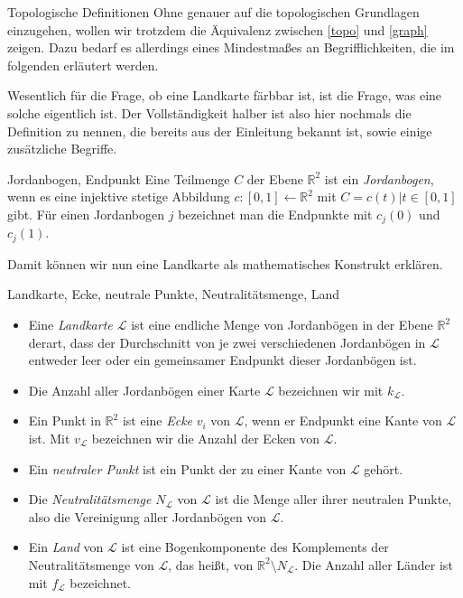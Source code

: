 \begin{section}{Topologische Definitionen}
 Ohne genauer auf die topologischen Grundlagen einzugehen, wollen wir trotzdem die Äquivalenz zwischen \ref{topo} und \ref{graph} zeigen. Dazu bedarf es allerdings eines Mindestmaßes an Begrifflichkeiten, die im folgenden erläutert werden.
 
 Wesentlich für die Frage, ob eine Landkarte färbbar ist, ist die Frage, was eine solche eigentlich ist. Der Vollständigkeit halber ist also hier nochmals die Definition zu nennen, die bereits aus der Einleitung bekannt ist, sowie einige zusätzliche Begriffe.
 
 \begin{definition}{Jordanbogen, Endpunkt}
  Eine Teilmenge $C$ der Ebene $\mathbb{R}^2$ ist ein \textit{Jordanbogen}, wenn es eine injektive stetige Abbildung $c:[0,1] \leftarrow \mathbb{R}^2$ mit $C = {c(t)|t\in [0,1]}$ gibt. Für einen Jordanbogen $j$ bezeichnet man die Endpunkte mit $c_j(0)$ und $c_j(1)$.
 \end{definition}
 
 Damit können wir nun eine Landkarte als mathematisches Konstrukt erklären.
 
 \begin{definition}{Landkarte, Ecke, neutrale Punkte, Neutralitätsmenge, Land}
  \-\ 
  \begin{itemize}
    \item Eine \textit{Landkarte $\mathcal{L}$} ist eine endliche Menge von Jordanbögen in der Ebene $\mathbb{R}^2$ derart, dass der Durchschnitt von je zwei verschiedenen Jordanbögen in $\mathcal{L}$ entweder leer oder ein gemeinsamer Endpunkt dieser Jordanbögen ist.
    \item Die Anzahl aller Jordanbögen einer Karte $\mathcal{L}$ bezeichnen wir mit $k_\mathcal{L}$.
    \item Ein Punkt in $\mathbb{R}^2$ ist eine \textit{Ecke} $v_i$ von $\mathcal{L}$, wenn er Endpunkt eine Kante von $\mathcal{L}$ ist. Mit $v_\mathcal{L}$ bezeichnen wir die Anzahl der Ecken von $\mathcal{L}$.
    \item Ein \textit{neutraler Punkt} ist ein Punkt der zu einer Kante von $\mathcal{L}$ gehört.
    \item Die \textit{Neutralitätsmenge $N_{\mathcal{L}}$} von $\mathcal{L}$ ist die Menge aller ihrer neutralen Punkte, also die Vereinigung aller Jordanbögen von $\mathcal{L}$. 
    \item Ein \textit{Land} von $\mathcal{L}$ ist eine Bogenkomponente des Komplements der Neutralitätsmenge von $\mathcal{L}$, das heißt, von $\mathbb{R}^2 \setminus N_{\mathcal{L}}$. Die Anzahl aller Länder ist mit $f_\mathcal{L}$ bezeichnet.
  \end{itemize}
 \end{definition}
 

\end{section}
